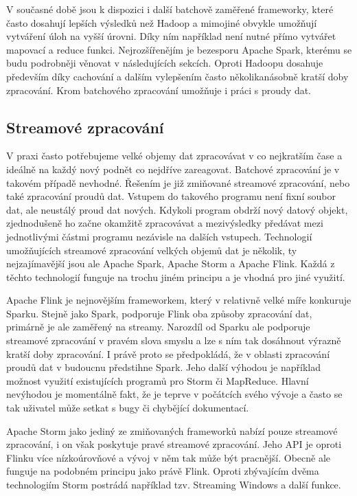 \documentclass[thesis=B,czech]{FITthesis}[2012/06/26]
\begin{document}
	V současné době jsou k dispozici i další batchově zaměřené frameworky, které často dosahují lepších výsledků než Hadoop a mimojiné obvykle umožňují vytváření úloh na vyšší úrovni. Díky ním například není nutné přímo vytvářet mapovací a reduce funkci. Nejrozšířenějím je bezesporu Apache Spark\cite{spark-home}, kterému se budu podrobněji věnovat v následujících sekcích. Oproti Hadoopu dosahuje především díky cachování a dalším vylepšením často několikanásobně kratší doby zpracování. Krom batchového zpracování umožňuje i práci s proudy dat. 

\subsection{Streamové zpracování}
	V praxi často potřebujeme velké objemy dat zpracovávat v co nejkratším čase a ideálně na každý nový podnět co nejdříve zareagovat. Batchové zpracování je v takovém případě nevhodné. Řešením je již zmiňované streamové zpracování, nebo také zpracování proudů dat. Vstupem do takového programu není fixní soubor dat, ale neustálý proud dat nových. Kdykoli program obdrží nový datový objekt, zjednodušeně ho začne okamžitě zpracovávat a mezivýsledky předávat mezi jednotlivými částmi programu nezávisle na dalších vstupech. Technologií umožňujících streamové zpracování velkých objemů dat je několik, ty nejzajímavější jsou ale Apache Spark, Apache Storm a Apache Flink. Každá z těchto technologií funguje na trochu jiném principu a je vhodná pro jiné využití. 
	
	Apache Flink je nejnovějším frameworkem, který v relativně velké míře konkuruje Sparku. Stejně jako Spark, podporuje Flink oba způsoby zpracování dat, primárně je ale zaměřený na streamy. Narozdíl od Sparku ale podporuje streamové zpracování v pravém slova smyslu a lze s ním tak dosáhnout výrazně kratší doby zpracování\cite{streaming-benchmark}. I právě proto se předpokládá, že v oblasti zpracování proudů dat v budoucnu předstihne Spark\cite{flink-future}. Jeho další výhodou je například možnost využití existujících programů pro Storm či MapReduce. Hlavní nevýhodou je momentálně fakt, že je teprve v počátcích svého vývoje a často se tak uživatel může setkat s bugy či chybějící dokumentací. 
	
	Apache Storm jako jediný ze zmiňovaných frameworků nabízí pouze streamové zpracování, i on však poskytuje pravé streamové zpracování. Jeho API je oproti Flinku více nízkoúrovňové a vývoj v něm tak může být pracnější. Obecně ale funguje na podobném principu jako právě Flink. Oproti zbývajícím dvěma technologiím Storm postrádá například tzv. Streaming Windows a další funkce\cite{so-flink-storm}.
	
\end{document}
